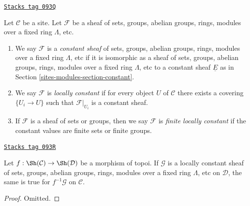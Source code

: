 \begin{definition}
\label{sites-modules-definition-locally-constant}
\href{https://stacks.math.columbia.edu/tag/093Q}{\texttt{Stacks tag 093Q}}

Let $\mathcal{C}$ be a site. Let $\mathcal{F}$ be a sheaf of sets, groups,
abelian groups, rings, modules over a fixed ring $\Lambda$, etc.
\begin{enumerate}
\item We say $\mathcal{F}$ is a
{\it constant sheaf} of
sets, groups, abelian groups, rings, modules over a fixed ring $\Lambda$, etc
if it is isomorphic as a sheaf of
sets, groups, abelian groups, rings, modules over a fixed ring $\Lambda$, etc
to a constant sheaf $\underline{E}$ as in Section \ref{sites-modules-section-constant}.
\item We say $\mathcal{F}$ is {\it locally constant} if for every object
$U$ of $\mathcal{C}$ there exists a
covering $\{U_i \to U\}$ such that $\mathcal{F}|_{U_i}$ is a constant sheaf.
\item If $\mathcal{F}$ is a sheaf of sets or groups, then we say $\mathcal{F}$
is {\it finite locally constant} if the constant values are finite sets or
finite groups.
\end{enumerate}
\end{definition}

\begin{lemma}
\label{sites-modules-lemma-pullback-locally-constant}
\href{https://stacks.math.columbia.edu/tag/093R}{\texttt{Stacks tag 093R}}

Let $f : \Sh(\mathcal{C}) \to \Sh(\mathcal{D})$ be a morphism of topoi.
If $\mathcal{G}$ is a locally constant sheaf of
sets, groups, abelian groups, rings, modules over a fixed ring $\Lambda$, etc
on $\mathcal{D}$, the same is true for $f^{-1}\mathcal{G}$
on $\mathcal{C}$.
\end{lemma}

\begin{proof}
Omitted.
\end{proof}

